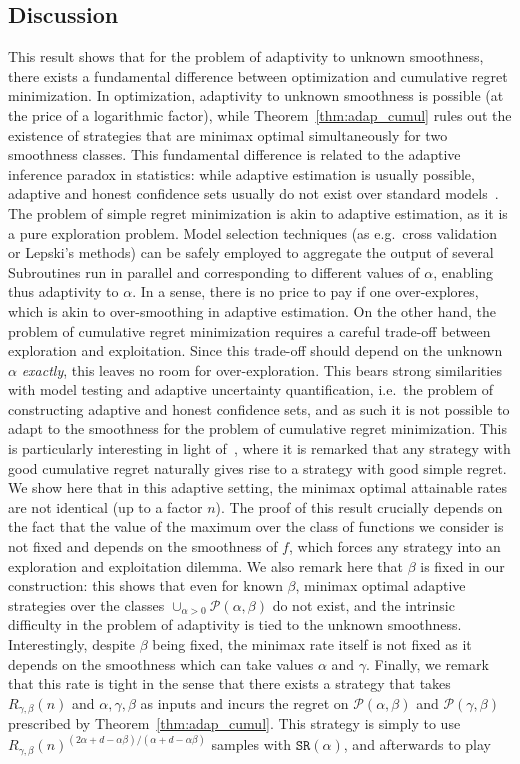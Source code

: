 \documentclass[final,12pt]{colt2018}
\begin{document}
\subsection{Discussion}
This result shows that for the problem of adaptivity to unknown smoothness, there exists a fundamental difference between optimization  and cumulative regret minimization. In optimization, adaptivity to unknown smoothness is possible (at the price of a logarithmic factor), while Theorem~\ref{thm:adap_cumul} rules out the existence of strategies that are minimax optimal simultaneously for two smoothness classes. This fundamental difference is related to the adaptive inference paradox in statistics: while adaptive estimation is usually possible, adaptive and honest confidence sets usually do not exist over standard models~\cite{cai2006adaptive,hoffmann2011adaptive}. The problem of simple regret minimization is akin to adaptive estimation, as it is a pure exploration problem. Model selection techniques (as e.g.~cross validation or Lepski's methods) can be safely employed to aggregate the output of several Subroutines run in parallel and corresponding to different values of $\alpha$, enabling thus adaptivity to $\alpha$. In a sense, there is no price to pay if one over-explores, which is akin to over-smoothing in adaptive estimation. On the other hand, the problem of cumulative regret minimization requires a careful trade-off between exploration and exploitation. Since this trade-off should depend on the unknown $\alpha$ \textit{exactly}, this leaves no room for over-exploration. This bears strong similarities with model testing and adaptive uncertainty quantification, i.e.~the problem of constructing adaptive and honest confidence sets, and as such it is not possible to adapt to the smoothness for the problem of cumulative regret minimization. This is particularly interesting in light of~\cite{bubeck2011pure}, where it is remarked that any strategy with good cumulative regret naturally gives rise to a strategy with good simple regret. We show here that in this adaptive setting, the minimax optimal attainable rates are not identical (up to a factor $n$). The proof of this result crucially depends on the fact that the value of the maximum over the class of functions we consider is not fixed and depends on the smoothness of $f$, which forces any strategy into an exploration and exploitation dilemma. We also remark here that $\beta$ is fixed in our construction: this shows that even for known $\beta$, minimax optimal adaptive strategies over the classes $\cup_{\alpha > 0} \mathcal P(\alpha, \beta)$ do not exist, and the intrinsic difficulty in the problem of adaptivity is tied to the unknown smoothness. Interestingly, despite $\beta$ being fixed, the minimax rate itself is not fixed as it depends on the smoothness which can take values $\alpha$ and $\gamma$. Finally, we remark that this rate is tight in the sense that there exists a  strategy that takes $R_{\gamma, \beta}(n)$ and $\alpha,\gamma,\beta$ as inputs and incurs the regret on $\mathcal P(\alpha,\beta)$ and $\mathcal P(\gamma, \beta)$ prescribed by Theorem~\ref{thm:adap_cumul}. This strategy is simply to use $R_{\gamma, \beta}(n)^{(2\alpha+d-\alpha\beta)/(\alpha+d-\alpha\beta)}$ samples with $\texttt{SR}(\alpha)$, and afterwards to play 
\end{document}
